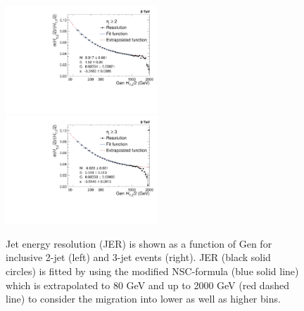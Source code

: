 \begin{figure}[!h]
 \begin{center}
 \hspace*{-5mm}\includegraphics[width=0.51\textwidth]{Plots_HT_2_150/Extrapolate_Sigma_Value_Res_2_crystal_range_ext.pdf}%
 ~~\includegraphics[width=0.51\textwidth]{Plots_HT_2_150/Extrapolate_Sigma_Value_Res_3_crystal_ext.pdf}
 \caption[Jet energy resolution (JER) is shown as a function of Gen \httwo.]{Jet energy resolution (JER) is shown as a function of Gen \httwo for inclusive 2-jet (left) and 3-jet events (right). JER (black solid circles) is fitted by using the modified NSC-formula (blue solid line) which is extrapolated to 80 GeV and up to 2000 GeV (red dashed line) to consider the migration into lower as well as higher bins.}
 \label{fig:resolution}
 \end{center}
\end{figure}
 
